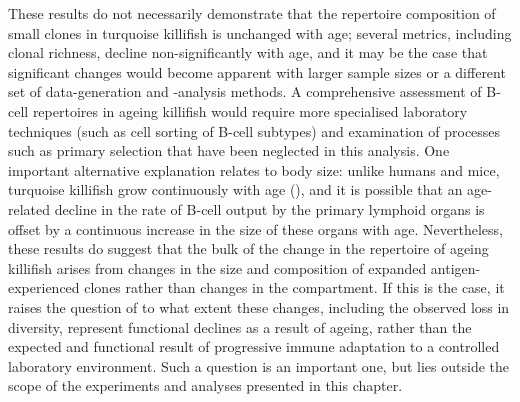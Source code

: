 These results do not necessarily demonstrate that the repertoire composition of small clones in turquoise killifish is unchanged with age; several metrics, including clonal richness, decline non-significantly with age, and it may be the case that significant changes would become apparent with larger sample sizes or a different set of data-generation and -analysis methods. A comprehensive assessment of \naive B-cell repertoires in ageing killifish would require more specialised laboratory techniques (such as cell sorting of B-cell subtypes) and examination of processes such as primary selection that have been neglected in this analysis. One important alternative explanation relates to body size: unlike humans and mice, turquoise killifish grow continuously with age (), and it is possible that an age-related decline in the rate of B-cell output by the primary lymphoid organs is offset by a continuous increase in the size of these organs with age. Nevertheless, these results do suggest that the bulk of the change in the  repertoire of ageing killifish arises from changes in the size and composition of expanded antigen-experienced clones rather than changes in the \naive compartment. If this is the case, it raises the question of to what extent these changes, including the observed loss in diversity, represent functional declines as a result of ageing, rather than the expected and functional result of progressive immune adaptation to a controlled laboratory environment. Such a question is an important one, but lies outside the scope of the experiments and analyses presented in this chapter.

